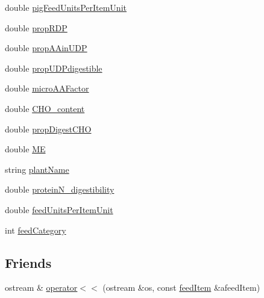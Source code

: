 \begin{DoxyCompactItemize}
\item 
double \hyperlink{classfeed_item_a6fbec7b5517fc40ec79d2025a8a4c5f3}{pigFeedUnitsPerItemUnit}
\item 
double \hyperlink{classfeed_item_a7631eb60bc61ffe1747e2d7905074354}{propRDP}
\item 
double \hyperlink{classfeed_item_ab36221fe47963d288d641657c5db3acb}{propAAinUDP}
\item 
double \hyperlink{classfeed_item_a9890859fae7f6b709f9842dcc1c3d11b}{propUDPdigestible}
\item 
double \hyperlink{classfeed_item_aee79c71dcce27b38af7153777916bf46}{microAAFactor}
\item 
double \hyperlink{classfeed_item_ad57f1616cff410de8e833da22378d416}{CHO\_\-content}
\item 
double \hyperlink{classfeed_item_a8ffe7ae013e011d4bede05e2e39039e0}{propDigestCHO}
\item 
double \hyperlink{classfeed_item_a4d57dea3c603dd66f10ff41a60454f7a}{ME}
\item 
string \hyperlink{classfeed_item_ad12c641f632a932c6123782c6a135db3}{plantName}
\item 
double \hyperlink{classfeed_item_aa01fdfb8e58ecf8c93596a5ace9465db}{proteinN\_\-digestibility}
\item 
double \hyperlink{classfeed_item_a0824c3a72ff1a705827a76d358d7648c}{feedUnitsPerItemUnit}
\item 
int \hyperlink{classfeed_item_a369939a9ed0763db7c8da0c17ee28faf}{feedCategory}
\end{DoxyCompactItemize}
\subsection*{Friends}
\begin{DoxyCompactItemize}
\item 
ostream \& \hyperlink{classfeed_item_ab4c308e0864a941e9652ae997df1142c}{operator$<$$<$} (ostream \&os, const \hyperlink{classfeed_item}{feedItem} \&afeedItem)
\end{DoxyCompactItemize}


